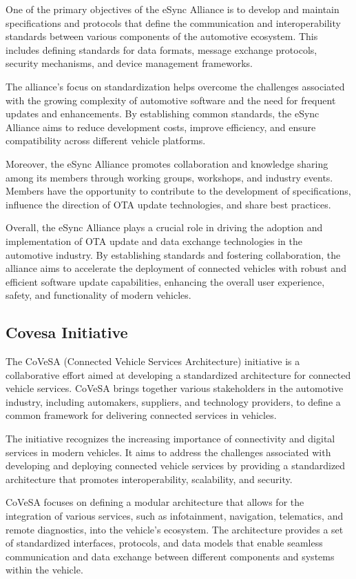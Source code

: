 \documentclass[
12pt,
oneside, 
onehalfspacing, 
nolistspacing, 
parskip, 
chapterinoneline, 
]{AASTCOMPUTER}
\begin{document}
One of the primary objectives of the eSync Alliance is to develop and maintain specifications and protocols that define the communication and interoperability standards between various components of the automotive ecosystem. This includes defining standards for data formats, message exchange protocols, security mechanisms, and device management frameworks.

The alliance's focus on standardization helps overcome the challenges associated with the growing complexity of automotive software and the need for frequent updates and enhancements. By establishing common standards, the eSync Alliance aims to reduce development costs, improve efficiency, and ensure compatibility across different vehicle platforms.

Moreover, the eSync Alliance promotes collaboration and knowledge sharing among its members through working groups, workshops, and industry events. Members have the opportunity to contribute to the development of specifications, influence the direction of OTA update technologies, and share best practices.

Overall, the eSync Alliance plays a crucial role in driving the adoption and implementation of OTA update and data exchange technologies in the automotive industry. By establishing standards and fostering collaboration, the alliance aims to accelerate the deployment of connected vehicles with robust and efficient software update capabilities, enhancing the overall user experience, safety, and functionality of modern vehicles.

\subsection{Covesa Initiative}
The CoVeSA (Connected Vehicle Services Architecture) \cite{CovesaAlliance} initiative is a collaborative effort aimed at developing a standardized architecture for connected vehicle services. CoVeSA brings together various stakeholders in the automotive industry, including automakers, suppliers, and technology providers, to define a common framework for delivering connected services in vehicles.

The initiative recognizes the increasing importance of connectivity and digital services in modern vehicles. It aims to address the challenges associated with developing and deploying connected vehicle services by providing a standardized architecture that promotes interoperability, scalability, and security.

CoVeSA focuses on defining a modular architecture that allows for the integration of various services, such as infotainment, navigation, telematics, and remote diagnostics, into the vehicle's ecosystem. The architecture provides a set of standardized interfaces, protocols, and data models that enable seamless communication and data exchange between different components and systems within the vehicle.
\end{document}
